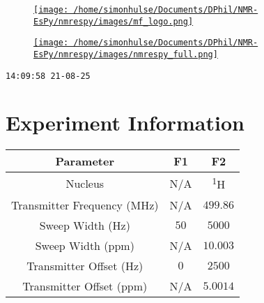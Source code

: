 \documentclass[8pt]{article}
\begin{document}
\begin{figure}[!ht]
\begin{minipage}[b][2.5cm][c]{.72\textwidth}
\href{http://foroozandeh.chem.ox.ac.uk/home}%
{\texttt{[image: /home/simonhulse/Documents/DPhil/NMR-EsPy/nmrespy/images/mf\_logo.png]}}
\end{minipage}
\begin{minipage}[b][2.5cm][c]{.27\textwidth}
\href{https://foroozandehgroup.github.io/NMR-EsPy}%
{\texttt{[image: /home/simonhulse/Documents/DPhil/NMR-EsPy/nmrespy/images/nmrespy\_full.png]}}
\end{minipage}
\end{figure}
\texttt{14:09:58 21-08-25}



\section*{Experiment Information}
\begin{longtable}[l]{c c c}
\toprule
Parameter & F1 & F2\\
\midrule
Nucleus & N/A & \textsuperscript{1}H\\
Transmitter Frequency (MHz) & N/A & $\num{499.86}$\\
Sweep Width (Hz) & $\num{50}$ & $\num{5000}$\\
Sweep Width (ppm) & N/A & $\num{10.003}$\\
Transmitter Offset (Hz) & $\num{0}$ & $\num{2500}$\\
Transmitter Offset (ppm) & N/A & $\num{5.0014}$\\
\bottomrule
\end{longtable}
\end{document}
